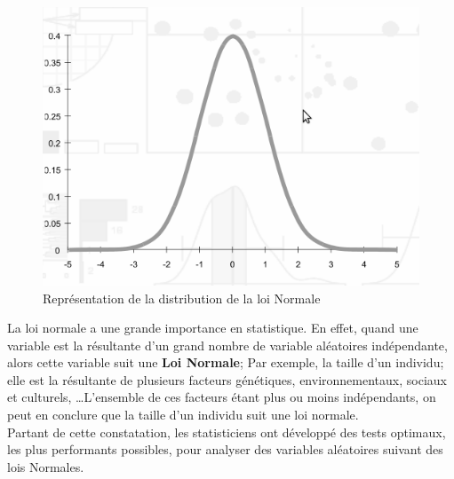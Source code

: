 \begin{figure}[H]\begin{center}\includegraphics[scale=0.5]{ilu/g3.png}\caption{Représentation de la distribution de la loi Normale}\end{center}\end{figure}
La loi normale a une grande importance en statistique. En effet, quand une variable est la résultante d'un grand nombre de variable aléatoires indépendante, alors cette variable suit une \textbf{Loi Normale}; Par exemple, la taille d'un individu; elle est la résultante de plusieurs facteurs génétiques, environnementaux, sociaux et culturels, \dots L'ensemble de ces facteurs étant plus ou moins indépendants, on peut en conclure que la taille d'un individu suit une loi normale.\newline
\\
Partant de cette constatation, les statisticiens ont développé des tests optimaux, les plus performants possibles, pour analyser des variables aléatoires suivant des lois Normales.
\newpage
